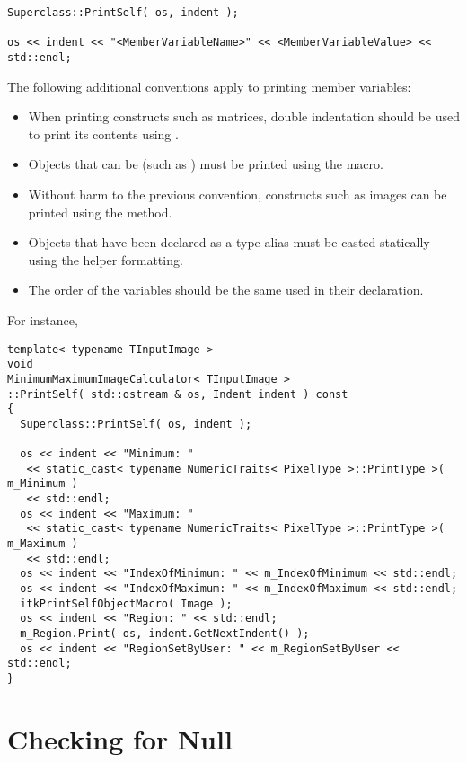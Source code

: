 \small
\begin{verbatim}
Superclass::PrintSelf( os, indent );

os << indent << "<MemberVariableName>" << <MemberVariableValue> << std::endl;
\end{verbatim}
\normalsize

The following additional conventions apply to printing member variables:
\begin{itemize}
\item When printing constructs such as matrices, double indentation should be
used to print its contents using .
\item Objects that can be  (such as ) must be
printed using the  macro.
\item Without harm to the previous convention, constructs such as images can
be printed using the  method.
\item Objects that have been declared as a type alias must be casted
statically using the  helper
formatting.
\item The order of the variables should be the same used in their declaration.
\end{itemize}

For instance,

\small
\begin{verbatim}
template< typename TInputImage >
void
MinimumMaximumImageCalculator< TInputImage >
::PrintSelf( std::ostream & os, Indent indent ) const
{
  Superclass::PrintSelf( os, indent );

  os << indent << "Minimum: "
   << static_cast< typename NumericTraits< PixelType >::PrintType >( m_Minimum )
   << std::endl;
  os << indent << "Maximum: "
   << static_cast< typename NumericTraits< PixelType >::PrintType >( m_Maximum )
   << std::endl;
  os << indent << "IndexOfMinimum: " << m_IndexOfMinimum << std::endl;
  os << indent << "IndexOfMaximum: " << m_IndexOfMaximum << std::endl;
  itkPrintSelfObjectMacro( Image );
  os << indent << "Region: " << std::endl;
  m_Region.Print( os, indent.GetNextIndent() );
  os << indent << "RegionSetByUser: " << m_RegionSetByUser << std::endl;
}
\end{verbatim}
\normalsize


\section{Checking for Null}
\label{sec:CheckingForNull}

